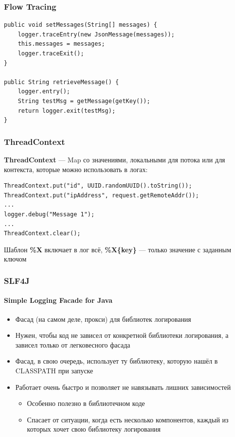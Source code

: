 \documentclass[xetex,mathserif,serif]{beamer}
\begin{document}
	\begin{frame}[fragile]
		\frametitle{Flow Tracing}
		\begin{verbatim}
public void setMessages(String[] messages) {
    logger.traceEntry(new JsonMessage(messages));
    this.messages = messages;
    logger.traceExit();
}

public String retrieveMessage() {
    logger.entry();
    String testMsg = getMessage(getKey());
    return logger.exit(testMsg);
}
		\end{verbatim}
	\end{frame}

	\begin{frame}[fragile]
		\frametitle{ThreadContext}
		\textbf{ThreadContext} --- Map со значениями, локальными для потока или для контекста, которые можно использовать в логах:
		\begin{verbatim}
ThreadContext.put("id", UUID.randomUUID().toString());
ThreadContext.put("ipAddress", request.getRemoteAddr());
...
logger.debug("Message 1");
...
ThreadContext.clear();
		\end{verbatim}
		Шаблон \textbf{\%X} включает в лог всё, \textbf{\%X\{key\}} --- только значение с заданным ключом
	\end{frame}

	\begin{frame}
		\frametitle{SLF4J}
		\framesubtitle{Simple Logging Facade for Java}
		\begin{itemize}
			\item Фасад (на самом деле, прокси) для библиотек логирования
			\item Нужен, чтобы код не зависел от конкретной библиотеки логирования, а зависел только от легковесного фасада
			\item Фасад, в свою очередь, использует ту библиотеку, которую нашёл в CLASSPATH при запуске
			\item Работает очень быстро и позволяет не навязывать лишних зависимостей
			\begin{itemize}
				\item Особенно полезно в библиотечном коде
				\item Спасает от ситуации, когда есть несколько компонентов, каждый из которых хочет свою библиотеку логирования
			\end{itemize}
		\end{itemize}
	\end{frame}
\end{document}

